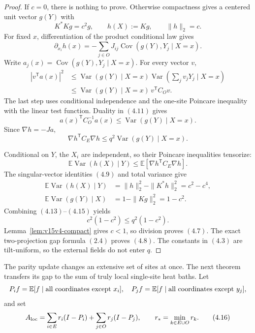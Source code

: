 \documentclass[11pt]{article}
\theoremstyle{remark}
\begin{document}
\begin{proof}
If \(c=0\), there is nothing to prove.  Otherwise compactness gives
a centered unit vector \(g(Y)\) with
\[
 K^*Kg=c^2g,\qquad h(X):=Kg,\qquad \|h\|_2=c.                \tag{4.9}
\]
For fixed \(x\), differentiation of the product conditional law
gives
\[
 \partial_{x_i}h(x)
 =-\sum_{j\in O}J_{ij}
   \operatorname{Cov}(g(Y),Y_j\mid X=x).                     \tag{4.10}
\]
Write \(a_j(x)=\operatorname{Cov}(g(Y),Y_j\mid X=x)\).
For every vector \(v\),
\[
 \begin{split}
 |v^{\mathsf T}a(x)|^2
 &\le\operatorname{Var}(g(Y)\mid X=x)
      \operatorname{Var}\left(\sum_jv_jY_j\mid X=x\right)\\
 &\le\operatorname{Var}(g(Y)\mid X=x)\,
      v^{\mathsf T}C_Ov.                                    \tag{4.11}
 \end{split}
\]
The last step uses conditional independence and the one-site
Poincare inequality with the linear test function.  Duality in
\((4.11)\) gives
\[
 a(x)^{\mathsf T}C_O^{-1}a(x)
 \le\operatorname{Var}(g(Y)\mid X=x).                        \tag{4.12}
\]
Since \(\nabla h=-Ja\),
\[
 \nabla h^{\mathsf T}C_E\nabla h
 \le q^2\operatorname{Var}(g(Y)\mid X=x).                    \tag{4.13}
\]

Conditional on \(Y\), the \(X_i\) are independent, so their
Poincare inequalities tensorize:
\[
 \mathbb E\operatorname{Var}(h(X)\mid Y)
 \le\mathbb E[\nabla h^{\mathsf T}C_E\nabla h].              \tag{4.14}
\]
The singular-vector identities \((4.9)\) and total variance give
\[
 \begin{split}
 \mathbb E\operatorname{Var}(h(X)\mid Y)
 &=\|h\|_2^2-\|K^*h\|_2^2
   =c^2-c^4,\\
 \mathbb E\operatorname{Var}(g(Y)\mid X)
 &=1-\|Kg\|_2^2
   =1-c^2.                                                   \tag{4.15}
 \end{split}
\]
Combining \((4.13)\)--\((4.15)\) yields
\[
 c^2(1-c^2)\le q^2(1-c^2).
\]
Lemma~\ref{lem:v15v4-compact} gives \(c<1\), so division proves
\((4.7)\).  The exact two-projection gap formula \((2.4)\) proves
\((4.8)\).  The constants in \((4.3)\) are tilt-uniform, so the
external fields do not enter \(q\).
\end{proof}

The parity update changes an extensive set of sites at once.  The
next theorem transfers its gap to the sum of truly local
single-site heat baths.  Let
\[
 P_i f=\mathbb E[f\mid\hbox{all coordinates except }x_i],
 \quad
 P_j f=\mathbb E[f\mid\hbox{all coordinates except }y_j],
\]
and set
\[
 A_{\rm loc}
 =\sum_{i\in E}r_i(I-P_i)+\sum_{j\in O}r_j(I-P_j),
 \qquad r_*=\min_{k\in E\cup O}r_k.                          \tag{4.16}
\]
\end{document}
